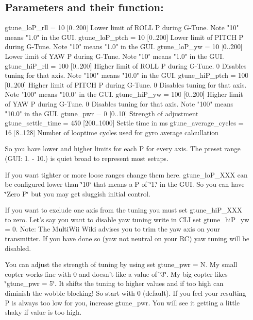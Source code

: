 \subsection*{Parameters and their function\+:}

\begin{DoxyVerb}gtune_loP_rll        = 10  [0..200] Lower limit of ROLL P during G-Tune.  Note "10" means "1.0" in the GUI.
gtune_loP_ptch       = 10  [0..200] Lower limit of PITCH P during G-Tune. Note "10" means "1.0" in the GUI.
gtune_loP_yw         = 10  [0..200] Lower limit of YAW P during G-Tune.   Note "10" means "1.0" in the GUI.
gtune_hiP_rll        = 100 [0..200] Higher limit of ROLL P during G-Tune. 0 Disables tuning for that axis.  Note "100" means "10.0" in the GUI.
gtune_hiP_ptch       = 100 [0..200] Higher limit of PITCH P during G-Tune. 0 Disables tuning for that axis. Note "100" means "10.0" in the GUI.
gtune_hiP_yw         = 100 [0..200] Higher limit of YAW P during G-Tune. 0 Disables tuning for that axis.   Note "100" means "10.0" in the GUI.
gtune_pwr            = 0   [0..10] Strength of adjustment
gtune_settle_time    = 450 [200..1000] Settle time in ms
gtune_average_cycles = 16  [8..128] Number of looptime cycles used for gyro average calcullation
\end{DoxyVerb}


So you have lower and higher limits for each P for every axis. The preset range (G\+U\+I\+: 1. -\/ 10.) is quiet broad to represent most setups.

If you want tighter or more loose ranges change them here. gtune\+\_\+lo\+P\+\_\+\+X\+X\+X can be configured lower than \char`\"{}10\char`\"{} that means a P of \char`\"{}1.\char`\"{} in the G\+U\+I. So you can have \char`\"{}\+Zero P\char`\"{} but you may get sluggish initial control.

If you want to exclude one axis from the tuning you must set gtune\+\_\+hi\+P\+\_\+\+X\+X\+X to zero. Let's say you want to disable yaw tuning write in C\+L\+I {\ttfamily set gtune\+\_\+hi\+P\+\_\+yw = 0}. Note\+: The Multi\+Wii Wiki advises you to trim the yaw axis on your transmitter. If you have done so (yaw not neutral on your R\+C) yaw tuning will be disabled.

You can adjust the strength of tuning by using {\ttfamily set gtune\+\_\+pwr = N}. My small copter works fine with 0 and doesn't like a value of \char`\"{}3\char`\"{}. My big copter likes \char`\"{}gtune\+\_\+pwr = 5\char`\"{}. It shifts the tuning to higher values and if too high can diminish the wobble blocking! So start with 0 (default). If you feel your resulting P is always too low for you, increase gtune\+\_\+pwr. You will see it getting a little shaky if value is too high. 